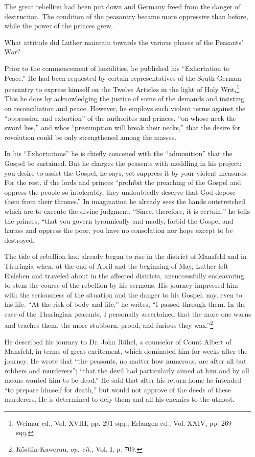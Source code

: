 The great rebellion had been put down and Germany freed from
the danger of destruction. The condition of the peasantry became
more oppressive than before, while the power of the princes grew.

What attitude did Luther maintain towards the various phases of
the Peasants’ War?

Prior to the commencement of hostilities, he published his ``Exhortation
to Peace.'' He had been requested by certain representatives
of the South German peasantry to express himself on the Twelve
Articles in the light of Holy Writ,\footnote
{Weimar ed., Vol. XVIII, pp. 291 sqq.; Erlangen ed., Vol. XXIV, pp. 269 sqq.}
This he does by acknowledging
the justice of some of the demands and insisting on reconciliation and
peace. However, he employs such violent terms against the ``oppression
and extortion'' of the authorites and princes, ``on whose neck
the sword lies,'' and whos ``presumption will break their necks,''
that the desire for revolution could be only strengthened among the
masses.

In his “Exhortations” he is chiefly concened with the ``admonition'' that
the Gospel be sustained. But he charges the peasents with meddling in his
project; you desire to assist the Gospel, he says, yet suppress it by your violent
measures. For the rest, if the lords and princes “prohibit the preaching of
the Gospel and oppress the people so intolerably, they undoubtedly deserve
that God depose them from their thrones.” In imagination he already sees
the hands outstretched which are to execute the divine judgment. “Since,
therefore, it is certain,” he tells the princes, “that you govern tyrannically
and madly, forbid the Gospel and harass and oppress the poor, you have no
consolation nor hope except to be destroyed.

The tide of rebellion had already begun to rise in the district of
Mansfeld and in Thuringia when, at the end of April and the beginning
of May, Luther left Eisleben and traveled about in the affected
districts, unsuccessfully endeavoring to stem the course of the rebellion
by his sermons. His journey impressed him with the seriousness
of the situation and the danger to his Gospel, nay, even to his life.
“At the risk of body and life,” he writes, “I passed through them. In
the case of the Thuringian peasants, I personally ascertained that the more
one warns and teaches them, the more stubborn, proud, and furious they
wax.”\footnote{Köstlin-Kawerau, \textit{op. cit.}, Vol. I, p. 709.}

He described his journey to Dr. John Rühel, a counselor of Count Albert
of Mansfeld, in terms of great excitement, which dominated him for weeks
after the journey. He wrote that “the peasants, no matter how numerous,
are after all but robbers and murderers”; “that the devil had particularly
aimed at him and by all means wanted him to be dead.” He said that after
his return home he intended “to prepare himself for death,” but would not
approve of the deeds of these murderers. He is determined to defy them and
all his enemies to the utmost.

